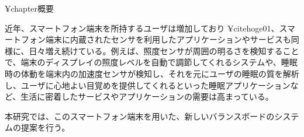 

¥chapter{概要}

近年、スマートフォン端末を所持するユーザは増加しており ¥cite{hoge01}、スマートフォン端末に内蔵されたセンサを利用したアプリケーションやサービスも同様に、日々増え続けている。例えば、照度センサが周囲の明るさを検知することで、端末のディスプレイの照度レベルを自動で調節してくれるシステムや、睡眠時の体動を端末内の加速度センサが検知し、それを元にユーザの睡眠の質を解析し、ユーザに心地よい目覚めを提供してくれるといった睡眠アプリケーションなど、生活に密着したサービスやアプリケーションの需要は高まっている。

本研究では、このスマートフォン端末を用いた、新しいバランスボードのシステムの提案を行う。

